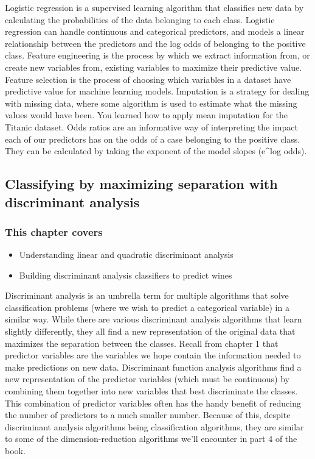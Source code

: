 \documentclass[
]{article}
\providecommand{\tightlist}{%
  \setlength{\itemsep}{0pt}\setlength{\parskip}{0pt}}
\begin{document}
Logistic regression is a supervised learning algorithm that classifies
new data by calculating the probabilities of the data belonging to each
class. Logistic regression can handle continuous and categorical
predictors, and models a linear relationship between the predictors and
the log odds of belonging to the positive class. Feature engineering is
the process by which we extract information from, or create new
variables from, existing variables to maximize their predictive value.
Feature selection is the process of choosing which variables in a
dataset have predictive value for machine learning models. Imputation is
a strategy for dealing with missing data, where some algorithm is used
to estimate what the missing values would have been. You learned how to
apply mean imputation for the Titanic dataset. Odds ratios are an
informative way of interpreting the impact each of our predictors has on
the odds of a case belonging to the positive class. They can be
calculated by taking the exponent of the model slopes (e\^{}log odds).

\subsection{Classifying by maximizing separation with discriminant
analysis}\label{classifying-by-maximizing-separation-with-discriminant-analysis}

\subsubsection{This chapter covers}\label{this-chapter-covers}

\begin{itemize}
\tightlist
\item
  Understanding linear and quadratic discriminant analysis
\item
  Building discriminant analysis classifiers to predict wines
\end{itemize}

Discriminant analysis is an umbrella term for multiple algorithms that
solve classification problems (where we wish to predict a categorical
variable) in a similar way. While there are various discriminant
analysis algorithms that learn slightly differently, they all find a new
representation of the original data that maximizes the separation
between the classes. Recall from chapter 1 that predictor variables are
the variables we hope contain the information needed to make predictions
on new data. Discriminant function analysis algorithms find a new
representation of the predictor variables (which must be continuous) by
combining them together into new variables that best discriminate the
classes. This combination of predictor variables often has the handy
benefit of reducing the number of predictors to a much smaller number.
Because of this, despite discriminant analysis algorithms being
classification algorithms, they are similar to some of the
dimension-reduction algorithms we'll encounter in part 4 of the book.
\end{document}
